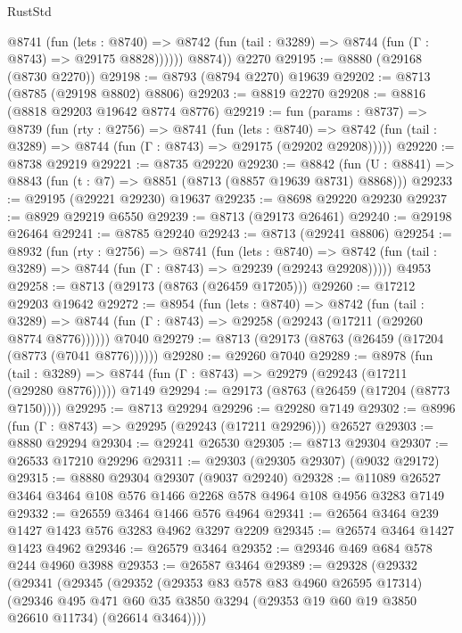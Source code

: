 \begin{lexlean}{RustStd}
\begin{coremodule}
            @8741
              (fun (lets : @8740) =>
              @8742 (fun (tail : @3289) => @8744 (fun (Γ : @8743) => @29175 @8828))))))
        @8874))
    @2270
@29195 := @8880 (@29168 (@8730 @2270))
@29198 := @8793 (@8794 @2270) @19639
@29202 := @8713 (@8785 (@29198 @8802) @8806)
@29203 := @8819 @2270
@29208 := @8816 (@8818 @29203 @19642 @8774 @8776)
@29219 := fun (params : @8737) =>
  @8739
    (fun (rty : @2756) =>
    @8741
      (fun (lets : @8740) =>
      @8742 (fun (tail : @3289) => @8744 (fun (Γ : @8743) => @29175 (@29202 @29208)))))
@29220 := @8738 @29219
@29221 := @8735 @29220
@29230 := @8842
    (fun (U : @8841) => @8843 (fun (t : @7) => @8851 (@8713 (@8857 @19639 @8731) @8868)))
@29233 := @29195 (@29221 @29230) @19637
@29235 := @8698 @29220 @29230
@29237 := @8929 @29219 @6550
@29239 := @8713 (@29173 @26461)
@29240 := @29198 @26464
@29241 := @8785 @29240
@29243 := @8713 (@29241 @8806)
@29254 := @8932
    (fun (rty : @2756) =>
    @8741
      (fun (lets : @8740) =>
      @8742 (fun (tail : @3289) => @8744 (fun (Γ : @8743) => @29239 (@29243 @29208)))))
    @4953
@29258 := @8713 (@29173 (@8763 (@26459 @17205)))
@29260 := @17212 @29203 @19642
@29272 := @8954
    (fun (lets : @8740) =>
    @8742
      (fun (tail : @3289) =>
      @8744 (fun (Γ : @8743) => @29258 (@29243 (@17211 (@29260 @8774 @8776))))))
    @7040
@29279 := @8713 (@29173 (@8763 (@26459 (@17204 (@8773 (@7041 @8776))))))
@29280 := @29260 @7040
@29289 := @8978
    (fun (tail : @3289) => @8744 (fun (Γ : @8743) => @29279 (@29243 (@17211 (@29280 @8776)))))
    @7149
@29294 := @29173 (@8763 (@26459 (@17204 (@8773 @7150))))
@29295 := @8713 @29294
@29296 := @29280 @7149
@29302 := @8996 (fun (Γ : @8743) => @29295 (@29243 (@17211 @29296))) @26527
@29303 := @8880 @29294
@29304 := @29241 @26530
@29305 := @8713 @29304
@29307 := @26533 @17210 @29296
@29311 := @29303 (@29305 @29307) (@9032 @29172)
@29315 := @8880 @29304 @29307 (@9037 @29240)
@29328 := @11089 @26527 @3464 @3464 @108 @576 @1466 @2268 @578 @4964 @108 @4956 @3283 @7149
@29332 := @26559 @3464 @1466 @576 @4964
@29341 := @26564 @3464 @239 @1427 @1423 @576 @3283 @4962 @3297 @2209
@29345 := @26574 @3464 @1427 @1423 @4962
@29346 := @26579 @3464
@29352 := @29346 @469 @684 @578 @244 @4960 @3988
@29353 := @26587 @3464
@29389 := @29328
    (@29332
      (@29341
        (@29345
          (@29352
            (@29353 @83 @578 @83 @4960 @26595 @17314)
            (@29346
              @495
              @471
              @60
              @35
              @3850
              @3294
              (@29353 @19 @60 @19 @3850 @26610 @11734)
              (@26614 @3464))))

\end{coremodule}
\end{lexlean}
